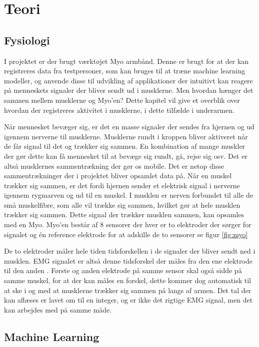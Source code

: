 \thispagestyle{fancy}
\chapter{Teori}
\label{chp:teori}

\section{Fysiologi}
\label{sec:fysiologi}
I projektet er der brugt værktøjet Myo armbånd. Denne er brugt for at der kan registreres data fra testpersoner, som kan bruges til at træne machine learning modeller, og anvende disse til udvikling af applikationer der intuitivt kan reagere på menneskets signaler der bliver sendt ud i musklerne. Men hvordan hænger det sammen mellem musklerne og Myo'en? Dette kapitel vil give et overblik over hvordan der registreres aktivitet i musklerne, i dette tilfælde i underarmen.

Når mennesket bevæger sig, er det en masse signaler der sendes fra hjernen og ud igennem nerverne til musklerne. Musklerne rundt i kroppen bliver aktiveret når de får signal til det og trækker sig sammen. En kombination af mange muskler der gør dette kan få mennesket til at bevæge sig rundt, gå, rejse sig osv. Det er altså musklernes sammentrækning der gør os mobile. Det er netop disse sammentrækninger der i projektet bliver opsamlet data på. Når en muskel trækker sig sammen, er det fordi hjernen sender et elektrisk signal i nerverne igennem rygmarven og ud til en muskel. I musklen er nerven forbundet til alle de små muskelfibre, som alle vil trække sig sammen, hvilket gør at hele musklen trækker sig sammen. Dette signal der trækker musklen sammen, kan opsamles med en Myo. Myo'en består af 8 sensorer der hver er to elektroder der sørger for signalet og én reference elektrode for at adskille de to sensorer se figur \ref{fig:myo}


De to elektroder måler hele tiden tidsforskellen i de signaler der bliver sendt ned i musklen. EMG signalet er altså denne tidsforskel der måles fra den ene elektrode til den anden \cite{nerveledning}. Første og anden elektrode på samme sensor skal også sidde på samme muskel, for at der kan måles en forskel, dette kommer dog automatisk til at ske i og med at musklerne trækker sig sammen på langs af armen. Det tal der kan aflæses er lavet om til en integer, og er ikke det rigtige EMG signal, men det kan arbejdes med på samme måde.

\section{Machine Learning}